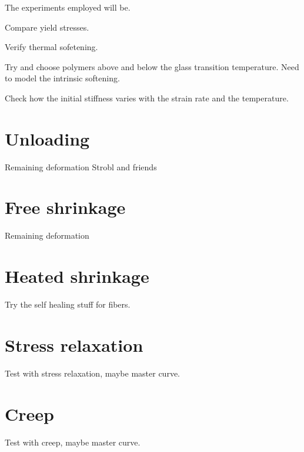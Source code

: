 The experiments employed will be.

Compare yield stresses.

Verify thermal sofetening.

Try and choose polymers above and below the glass transition temperature. Need to model the intrinsic softening.

Check how the initial stiffness varies with the strain rate and the temperature.

\section{Unloading}

Remaining deformation Strobl and friends

\section{Free shrinkage}

Remaining deformation

\section{Heated shrinkage}

\colorbox{CyanBlue}{Try the self healing stuff for fibers.}

\section{Stress relaxation}

Test with stress relaxation, maybe master curve.

\section{Creep}

Test with creep, maybe master curve.
